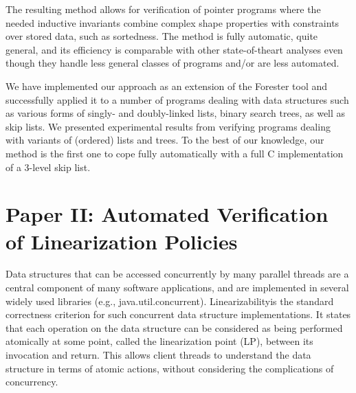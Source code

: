 The resulting method allows for verification of pointer programs where the needed inductive invariants combine complex shape properties with constraints over stored data, such as sortedness. The method is fully automatic, quite general, and its efficiency is comparable with other state-of-theart analyses even though they handle less general classes of programs and/or are less automated. 







We have implemented our approach as an extension of the Forester tool and successfully applied it to a number of programs dealing with data structures such as various forms of singly- and doubly-linked lists, binary search trees, as well as skip lists. We presented experimental results from verifying programs dealing with variants of (ordered) lists and trees. To the best of our knowledge, our method is the first one to cope fully automatically with a full C implementation of a 3-level skip list. 

\section{Paper II: Automated Verification of Linearization Policies} 
Data structures that can be accessed concurrently by many parallel threads are a central component of many software applications, and are implemented in several widely used libraries (e.g., java.util.concurrent). Linearizabilityis the standard correctness criterion for such concurrent data structure implementations. It states that each operation on the data structure can be considered as being performed atomically at some point, called the linearization point (LP), between its invocation and return. This allows client threads to understand the data structure in terms of atomic actions, without considering the complications of concurrency.

